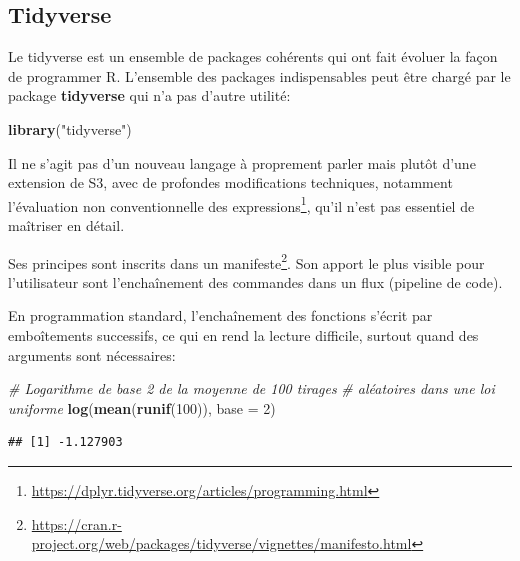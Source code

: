 \documentclass[
  12pt,
  french,
  a4paper,
  extrafontsizes,onecolumn,openright
  ]{memoir}
\newenvironment{Shaded}{\begin{snugshade}}{\end{snugshade}}
\newcommand{\CommentTok}[1]{\textcolor[rgb]{0.56,0.35,0.01}{\textit{#1}}}
\newcommand{\DataTypeTok}[1]{\textcolor[rgb]{0.13,0.29,0.53}{#1}}
\newcommand{\DecValTok}[1]{\textcolor[rgb]{0.00,0.00,0.81}{#1}}
\newcommand{\KeywordTok}[1]{\textcolor[rgb]{0.13,0.29,0.53}{\textbf{#1}}}
\newcommand{\NormalTok}[1]{#1}
\newcommand{\StringTok}[1]{\textcolor[rgb]{0.31,0.60,0.02}{#1}}
\begin{document}
\normalsize

\hypertarget{tidyverse}{%
\subsection{Tidyverse}\label{tidyverse}}

Le tidyverse est un ensemble de packages cohérents qui ont fait évoluer la façon de programmer R.
L'ensemble des packages indispensables peut être chargé par le package \textbf{tidyverse} qui n'a pas d'autre utilité:

\scriptsize

\begin{Shaded}
\begin{Highlighting}[]
\KeywordTok{library}\NormalTok{(}\StringTok{"tidyverse"}\NormalTok{)}
\end{Highlighting}
\end{Shaded}

\normalsize

Il ne s'agit pas d'un nouveau langage à proprement parler mais plutôt d'une extension de S3, avec de profondes modifications techniques, notamment l'évaluation non conventionnelle des expressions\footnote{\url{https://dplyr.tidyverse.org/articles/programming.html}}, qu'il n'est pas essentiel de maîtriser en détail.

Ses principes sont inscrits dans un manifeste\footnote{\url{https://cran.r-project.org/web/packages/tidyverse/vignettes/manifesto.html}}.
Son apport le plus visible pour l'utilisateur sont l'enchaînement des commandes dans un flux (pipeline de code).

En programmation standard, l'enchaînement des fonctions s'écrit par emboîtements successifs, ce qui en rend la lecture difficile, surtout quand des arguments sont nécessaires:

\scriptsize

\begin{Shaded}
\begin{Highlighting}[]
\CommentTok{# Logarithme de base 2 de la moyenne de 100 tirages}
\CommentTok{# aléatoires dans une loi uniforme}
\KeywordTok{log}\NormalTok{(}\KeywordTok{mean}\NormalTok{(}\KeywordTok{runif}\NormalTok{(}\DecValTok{100}\NormalTok{)), }\DataTypeTok{base =} \DecValTok{2}\NormalTok{)}
\end{Highlighting}
\end{Shaded}

\begin{verbatim}
## [1] -1.127903
\end{verbatim}
\end{document}
